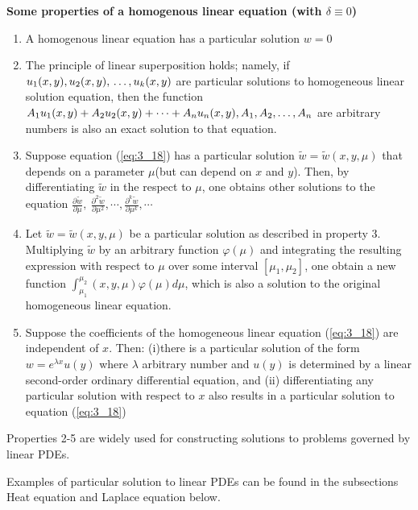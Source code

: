 \documentclass[11pt]{report}
\newcommand{\NI}{\noindent}
\newcommand{\sps}{\\[0.2cm]}
\newcommand{\refn}[1]{(\ref{#1})}
\newcommand{\refx}[1]{\refn{eq:#1}}
\newcommand{\bt}[1]{\textbf{#1}}
\newcommand{\dsp}{\displaystyle}
\newcommand{\tiw}{\widetilde{w}}
\begin{document}
	\NI\bt{Some properties of a homogenous linear equation (with $\delta \equiv 0$)}
	\begin{enumerate}
		\item A homogenous linear equation has a particular solution $w=0$
		\item The principle of linear superposition holds; namely, if $u_1(x,y),u_2(x,y),\\\ldots,u_k(x,y)$ are particular solutions to homogeneous linear solution equation, then the function $A_1u_1(x,y)+A_2u_2(x,y)+\cdots +A_nu_n(x,y),\\ A_1,A_2,\ldots,A_n$ are arbitrary numbers is also an exact solution to that equation.
		\item Suppose equation \refx{3_18} has a particular solution $\tiw = \tiw(x,y,\mu)$ that depends on a parameter $\mu$(but can depend on $x$ and $y$). Then, by differentiating $\tiw$ in the respect to $\mu$, one obtains other solutions to the equation $\dsp\frac{\partial\tiw}{\partial \mu},~\frac{\partial^2\tiw}{\partial \mu^2},\cdots,\frac{\partial^k\tiw}{\partial \mu^k},\cdots$
		\item Let $\tiw=\tiw(x,y,\mu)$ be a particular solution as described in property 3. Multiplying $\tiw$ by an arbitrary function $\varphi(\mu)$ and integrating the resulting expression with respect to $\mu$ over some interval $[\mu_1,\mu_2]$, one obtain a new function $\dsp\int_{\mu_1}^{\mu_2}(x,y,\mu)\varphi(\mu)d\mu$, which is also a solution to the original homogeneous linear equation.
		\item Suppose the coefficients of the homogeneous linear equation \refx{3_18} are independent of $x$. Then: (i)there is a particular solution of the form $w=e^{\lambda x}u(y)$ where $\lambda$ arbitrary number and $u(y)$ is determined by a linear second-order ordinary differential equation, and (ii) differentiating any particular solution with respect to $x$ also results in a particular solution to equation \refx{3_18}
	\end{enumerate}
	Properties 2-5 are widely used for constructing solutions to problems governed by linear PDEs.
	
	\NI Examples of particular solution to linear PDEs can be found in the subsections Heat equation and Laplace equation below.\sps
	
\end{document}
